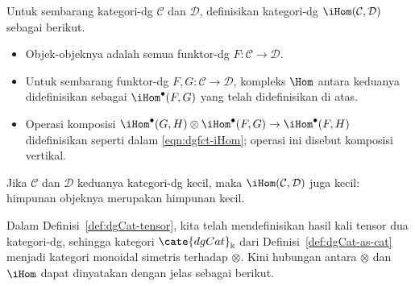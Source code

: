 \begin{definition}
	Untuk sembarang kategori-dg $\mathcal{C}$ dan $\mathcal{D}$, definisikan
	kategori-dg $\iHom(\mathcal{C},\mathcal{D})$ sebagai berikut.
	\begin{itemize}
		\item Objek-objeknya adalah semua funktor-dg
		$F:\mathcal{C}\to\mathcal{D}$.
		\item Untuk sembarang funktor-dg $F,G:\mathcal{C}\to\mathcal{D}$,
		kompleks $\Hom$ antara keduanya didefinisikan sebagai
		$\iHom^\bullet(F,G)$ yang telah didefinisikan di atas.
		\item Operasi komposisi
		$\iHom^\bullet(G,H)\otimes\iHom^\bullet(F,G)\to
		\iHom^\bullet(F,H)$ didefinisikan seperti dalam
		\eqref{eqn:dgfct-iHom}; operasi ini disebut komposisi vertikal.
	\end{itemize}
\end{definition}

Jika $\mathcal{C}$ dan $\mathcal{D}$ keduanya kategori-dg kecil, maka
$\iHom(\mathcal{C},\mathcal{D})$ juga kecil: himpunan objeknya merupakan
himpunan kecil.

Dalam Definisi~\ref{def:dgCat-tensor}, kita telah mendefinisikan hasil kali tensor
dua kategori-dg, sehingga kategori $\cate{dgCat}_{\Bbbk}$ dari
Definisi~\ref{def:dgCat-as-cat} menjadi kategori monoidal simetris terhadap
$\otimes$. Kini hubungan antara $\otimes$ dan $\iHom$ dapat dinyatakan dengan
jelas sebagai berikut.

